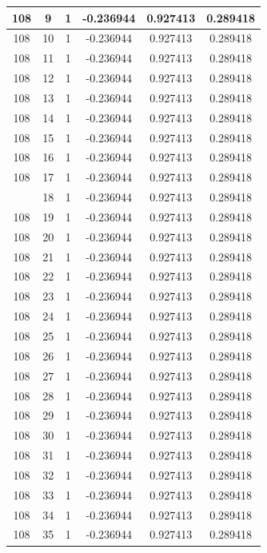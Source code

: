 \documentclass[12pt,a4paper]{article}
\numberwithin{equation}{section}
\numberwithin{figure}{section}
\numberwithin{table}{section}
\begin{document}
\begin{longtable}{|c|c|c|c|c|c|}
108 & 9 & 1 & -0.236944 & 0.927413 & 0.289418 \\ \hline
108 & 10 & 1 & -0.236944 & 0.927413 & 0.289418 \\ \hline
108 & 11 & 1 & -0.236944 & 0.927413 & 0.289418 \\ \hline
108 & 12 & 1 & -0.236944 & 0.927413 & 0.289418 \\ \hline
108 & 13 & 1 & -0.236944 & 0.927413 & 0.289418 \\ \hline
108 & 14 & 1 & -0.236944 & 0.927413 & 0.289418 \\ \hline
108 & 15 & 1 & -0.236944 & 0.927413 & 0.289418 \\ \hline
108 & 16 & 1 & -0.236944 & 0.927413 & 0.289418 \\ \hline
108 & 17 & 1 & -0.236944 & 0.927413 & 0.289418 \\ \hline
\pagebreak
108 & 18 & 1 & -0.236944 & 0.927413 & 0.289418 \\ \hline
108 & 19 & 1 & -0.236944 & 0.927413 & 0.289418 \\ \hline
108 & 20 & 1 & -0.236944 & 0.927413 & 0.289418 \\ \hline
108 & 21 & 1 & -0.236944 & 0.927413 & 0.289418 \\ \hline
108 & 22 & 1 & -0.236944 & 0.927413 & 0.289418 \\ \hline
108 & 23 & 1 & -0.236944 & 0.927413 & 0.289418 \\ \hline
108 & 24 & 1 & -0.236944 & 0.927413 & 0.289418 \\ \hline
108 & 25 & 1 & -0.236944 & 0.927413 & 0.289418 \\ \hline
108 & 26 & 1 & -0.236944 & 0.927413 & 0.289418 \\ \hline
108 & 27 & 1 & -0.236944 & 0.927413 & 0.289418 \\ \hline
108 & 28 & 1 & -0.236944 & 0.927413 & 0.289418 \\ \hline
108 & 29 & 1 & -0.236944 & 0.927413 & 0.289418 \\ \hline
108 & 30 & 1 & -0.236944 & 0.927413 & 0.289418 \\ \hline
108 & 31 & 1 & -0.236944 & 0.927413 & 0.289418 \\ \hline
108 & 32 & 1 & -0.236944 & 0.927413 & 0.289418 \\ \hline
108 & 33 & 1 & -0.236944 & 0.927413 & 0.289418 \\ \hline
108 & 34 & 1 & -0.236944 & 0.927413 & 0.289418 \\ \hline
108 & 35 & 1 & -0.236944 & 0.927413 & 0.289418 \\ \hline

\end{longtable}
\end{document}
